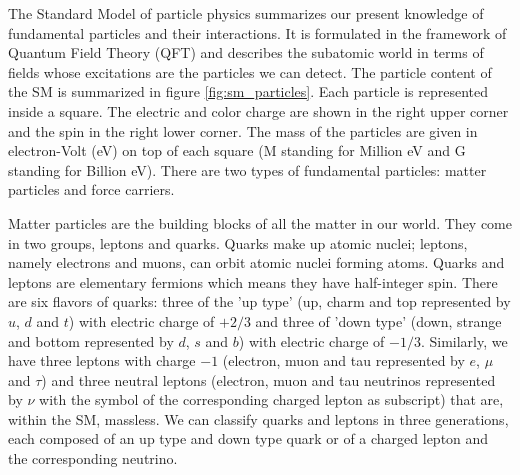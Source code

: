 %
%

The Standard Model of particle physics summarizes our present knowledge of fundamental particles and their interactions. It is formulated in the framework of Quantum Field Theory (QFT) and describes the subatomic world in terms of fields whose excitations are the particles we can detect. The particle content of the SM is summarized in figure \ref{fig:sm_particles}. Each particle is represented inside a square. The electric and color charge are shown in the right upper corner and the spin in the right lower corner. The mass of the particles are given in electron-Volt (eV) on top of each square (M standing for Million eV and G standing for Billion eV). There are two types of fundamental particles: matter particles and force carriers. 

Matter particles are the building blocks of all the matter in our world. They come in two groups, leptons and quarks. Quarks make up atomic nuclei; leptons, namely electrons and muons, can orbit atomic nuclei forming atoms. Quarks and leptons are elementary fermions which means they have half-integer spin. There are six flavors of quarks: three of the 'up type' (up, charm and top represented by $u$, $d$ and $t$) with electric charge of $+2/3$ and three of 'down type' (down, strange and bottom represented by $d$, $s$ and $b$) with electric charge of $-1/3$. Similarly, we have three leptons with charge $-1$ (electron, muon and tau represented by $e$, $\mu$ and $\tau$) and three neutral leptons (electron, muon and tau neutrinos represented by $\nu$ with the symbol of the corresponding charged lepton as subscript) that are, within the SM, massless. We can classify quarks and leptons in three generations, each composed of an up type and down type quark or of a charged lepton and the corresponding neutrino.

